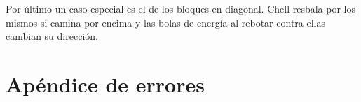 \documentclass[a4paper]{article}
\begin{document}
Por último un caso especial es el de los bloques en diagonal. Chell resbala por los mismos si camina por encima y las bolas de energía al rebotar contra ellas cambian su dirección.






\section{Apéndice de errores}
\end{document}
